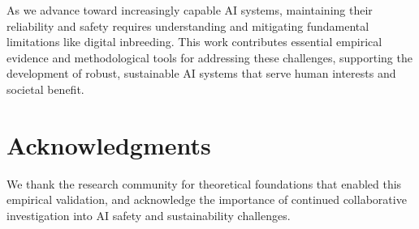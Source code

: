 \documentclass[11pt]{article}
\begin{document}
As we advance toward increasingly capable AI systems, maintaining their reliability and safety requires understanding and mitigating fundamental limitations like digital inbreeding. This work contributes essential empirical evidence and methodological tools for addressing these challenges, supporting the development of robust, sustainable AI systems that serve human interests and societal benefit.

\section*{Acknowledgments}

We thank the research community for theoretical foundations that enabled this empirical validation, and acknowledge the importance of continued collaborative investigation into AI safety and sustainability challenges.



\end{document}
